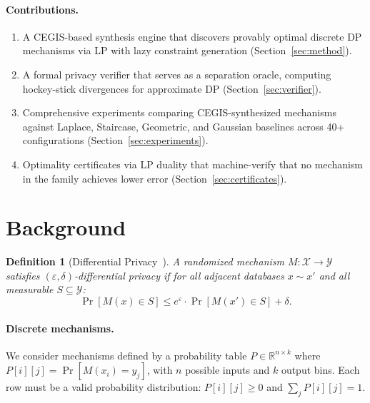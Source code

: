 \documentclass[11pt,a4paper]{article}
\newtheorem{definition}{Definition}
\begin{document}
\paragraph{Contributions.}
\begin{enumerate}
\item A CEGIS-based synthesis engine that discovers provably optimal
      discrete DP mechanisms via LP with lazy constraint generation
      (Section~\ref{sec:method}).
\item A formal privacy verifier that serves as a separation oracle,
      computing hockey-stick divergences for approximate DP
      (Section~\ref{sec:verifier}).
\item Comprehensive experiments comparing CEGIS-synthesized mechanisms
      against Laplace, Staircase, Geometric, and Gaussian baselines
      across 40+ configurations (Section~\ref{sec:experiments}).
\item Optimality certificates via LP duality that machine-verify that
      no mechanism in the family achieves lower error
      (Section~\ref{sec:certificates}).
\end{enumerate}

\section{Background}
\label{sec:background}

\begin{definition}[Differential Privacy~\cite{dwork2006calibrating}]
A randomized mechanism $M : \mathcal{X} \to \mathcal{Y}$ satisfies
$(\varepsilon,\delta)$-differential privacy if for all adjacent databases
$x \sim x'$ and all measurable $S \subseteq \mathcal{Y}$:
\[
  \Pr[M(x) \in S] \le e^\varepsilon \cdot \Pr[M(x') \in S] + \delta.
\]
\end{definition}

\paragraph{Discrete mechanisms.}
We consider mechanisms defined by a probability table
$P \in \mathbb{R}^{n \times k}$ where $P[i][j] = \Pr[M(x_i) = y_j]$,
with $n$ possible inputs and $k$ output bins.  Each row must be a valid
probability distribution: $P[i][j] \ge 0$ and $\sum_j P[i][j] = 1$.
\end{document}
